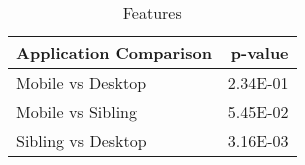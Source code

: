 \begin{table}[ht]
\centering
\caption{Features} 
\begin{tabular}{lr}
  \hline
Application Comparison & p-value \\ 
  \hline
Mobile vs Desktop & 2.34E-01 \\ 
  Mobile vs Sibling & 5.45E-02 \\ 
  Sibling vs Desktop & 3.16E-03 \\ 
   \hline
\end{tabular}
\label{tab:features}
\end{table}
